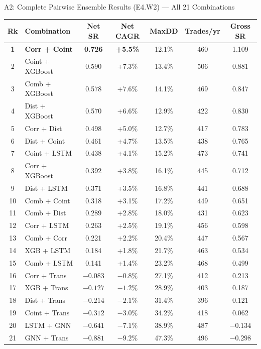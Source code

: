 \documentclass[aspectratio=169,10pt]{beamer}
\begin{document}
\begin{frame}{A2: Complete Pairwise Ensemble Results (E4.W2) --- All 21 Combinations}
  \centering\scriptsize\renewcommand{\arraystretch}{1.25}
  \begin{tabular}{clccccc}
    \toprule
    \textbf{Rk} & \textbf{Combination} & \textbf{Net SR} & \textbf{Net CAGR} & \textbf{MaxDD} & \textbf{Trades/yr} & \textbf{Gross SR} \\
    \midrule
    \rowcolor{hlrow}\textbf{1}  & \textbf{Corr + Coint} & \color{goodgreen}\textbf{0.726} & \textbf{+5.5\%} & 12.1\% & 460 & 1.109 \\
    2  & Coint + XGBoost & \color{goodgreen}0.590 & +7.3\% & 13.4\% & 506 & 0.881 \\
    3  & Comb  + XGBoost & \color{goodgreen}0.578 & +7.6\% & 14.1\% & 469 & 0.847 \\
    4  & Dist  + XGBoost & \color{goodgreen}0.570 & +6.6\% & 12.9\% & 422 & 0.830 \\
    5  & Corr  + Dist    & \color{goodgreen}0.498 & +5.0\% & 12.7\% & 417 & 0.783 \\
    6  & Dist  + Coint   & \color{goodgreen}0.461 & +4.7\% & 13.5\% & 438 & 0.765 \\
    7  & Coint + LSTM    & \color{goodgreen}0.438 & +4.1\% & 15.2\% & 473 & 0.741 \\
    8  & Corr  + XGBoost & \color{goodgreen}0.392 & +3.8\% & 16.1\% & 445 & 0.712 \\
    9  & Dist  + LSTM    & \color{goodgreen}0.371 & +3.5\% & 16.8\% & 441 & 0.688 \\
    10 & Comb  + Coint   & \color{goodgreen}0.318 & +3.1\% & 17.2\% & 449 & 0.651 \\
    11 & Comb  + Dist    & \color{goodgreen}0.289 & +2.8\% & 18.0\% & 431 & 0.623 \\
    12 & Corr  + LSTM    & \color{goodgreen}0.263 & +2.5\% & 19.1\% & 456 & 0.598 \\
    13 & Comb  + Corr    & 0.221 & +2.2\% & 20.4\% & 447 & 0.567 \\
    14 & XGB   + LSTM    & 0.184 & +1.8\% & 21.7\% & 463 & 0.534 \\
    15 & Comb  + LSTM    & 0.141 & +1.4\% & 23.2\% & 468 & 0.499 \\
    16 & Corr  + Trans   & $-0.083$ & $-0.8\%$ & 27.1\% & 412 & 0.213 \\
    17 & XGB   + Trans   & $-0.127$ & $-1.2\%$ & 28.9\% & 403 & 0.187 \\
    18 & Dist  + Trans   & $-0.214$ & $-2.1\%$ & 31.4\% & 396 & 0.121 \\
    19 & Coint + Trans   & $-0.312$ & $-3.0\%$ & 34.2\% & 418 & 0.062 \\
    20 & LSTM  + GNN     & \color{badred}$-0.641$ & $-7.1\%$ & 38.9\% & 487 & $-0.134$ \\
    \rowcolor{iitbsaff!10}21 & GNN + Trans & \color{badred}$-0.881$ & $-9.2\%$ & 47.3\% & 496 & $-0.298$ \\
    \bottomrule
  \end{tabular}
\end{frame}
\end{document}
